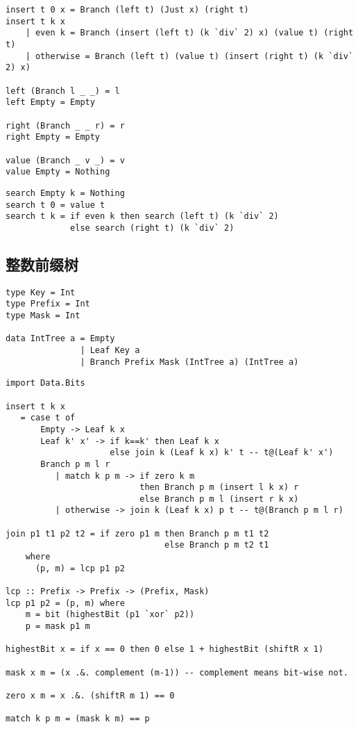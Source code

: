 \documentclass{ctexart}
\begin{document}
\lstset{language=Haskell}
\begin{lstlisting}[caption=整数Trie的插入算法]
insert t 0 x = Branch (left t) (Just x) (right t)
insert t k x
    | even k = Branch (insert (left t) (k `div` 2) x) (value t) (right t)
    | otherwise = Branch (left t) (value t) (insert (right t) (k `div` 2) x)

left (Branch l _ _) = l
left Empty = Empty

right (Branch _ _ r) = r
right Empty = Empty

value (Branch _ v _) = v
value Empty = Nothing
\end{lstlisting}

\lstset{language=Haskell}
\begin{lstlisting}[caption=整数Trie的查找算法]
search Empty k = Nothing
search t 0 = value t
search t k = if even k then search (left t) (k `div` 2)
             else search (right t) (k `div` 2)
\end{lstlisting}

\subsection{整数前缀树}

\lstset{language=Haskell}
\begin{lstlisting}[caption=整数前缀树的定义]
type Key = Int
type Prefix = Int
type Mask = Int

data IntTree a = Empty
               | Leaf Key a
               | Branch Prefix Mask (IntTree a) (IntTree a)
\end{lstlisting}

\lstset{language=Haskell}
\begin{lstlisting}[caption=整数前缀树的插入]
import Data.Bits

insert t k x
   = case t of
       Empty -> Leaf k x
       Leaf k' x' -> if k==k' then Leaf k x
                     else join k (Leaf k x) k' t -- t@(Leaf k' x')
       Branch p m l r
          | match k p m -> if zero k m
                           then Branch p m (insert l k x) r
                           else Branch p m l (insert r k x)
          | otherwise -> join k (Leaf k x) p t -- t@(Branch p m l r)

join p1 t1 p2 t2 = if zero p1 m then Branch p m t1 t2
                                else Branch p m t2 t1
    where
      (p, m) = lcp p1 p2

lcp :: Prefix -> Prefix -> (Prefix, Mask)
lcp p1 p2 = (p, m) where
    m = bit (highestBit (p1 `xor` p2))
    p = mask p1 m

highestBit x = if x == 0 then 0 else 1 + highestBit (shiftR x 1)

mask x m = (x .&. complement (m-1)) -- complement means bit-wise not.

zero x m = x .&. (shiftR m 1) == 0

match k p m = (mask k m) == p
\end{lstlisting}
\end{document}
